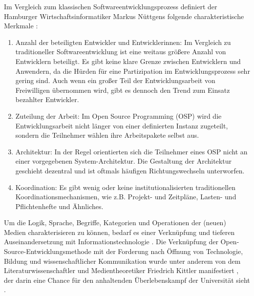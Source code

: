 Im Vergleich zum klassischen Softwareentwicklungsprozess definiert der Hamburger Wirtschaftsinformatiker Markus Nüttgens folgende charakteristische Merkmale \cite{Nuettgens_2014}:
\begin{enumerate}
\item Anzahl der beteiligten Entwickler und Entwicklerinnen: Im Vergleich zu traditioneller Softwareentwicklung ist eine weitaus größere Anzahl von Entwicklern beteiligt. Es gibt keine klare Grenze zwischen Entwicklern und Anwendern, da die Hürden für eine Partizipation im Entwicklungsprozess sehr gering sind. Auch wenn ein großer Teil der Entwicklungsarbeit von Freiwilligen übernommen wird, gibt es dennoch den Trend zum Einsatz bezahlter Entwickler.
\item Zuteilung der Arbeit: Im Open Source Programming (OSP) wird die Entwicklungsarbeit nicht länger von einer definierten Instanz zugeteilt, sondern die Teilnehmer wählen ihre Arbeitspakete selbst aus.
\item Architektur: In der Regel orientierten sich die Teilnehmer eines OSP nicht an einer vorgegebenen System-Architektur. Die Gestaltung der Architektur geschieht dezentral und ist oftmals häufigen Richtungswechseln unterworfen.
\item Koordination: Es gibt wenig oder keine institutionalisierten traditionellen Koordinationsmechanismen, wie z.B. Projekt- und Zeitpläne, Lasten- und Pflichtenhefte und Ähnliches.
\end{enumerate}

Um die Logik, Sprache, Begriffe, Kategorien und Operationen der (neuen) Medien charakterisieren zu können, bedarf es einer Verknüpfung und tieferen Auseinandersetzung mit Informationstechnologie \cite[:65]{Manovich_2001}. Die Verknüpfung der Open-Source-Entwicklungsmethode mit der Forderung nach Öffnung von Technologie, Bildung und wissenschaftlicher Kommunikation wurde unter anderem von dem Literaturwissenschaftler und Medientheoretiker Friedrich Kittler manifestiert \cite{Kittler_1999}, der darin eine Chance für den anhaltenden Überlebenskampf der Universität sieht \cite[:7]{Chun_2006}.

